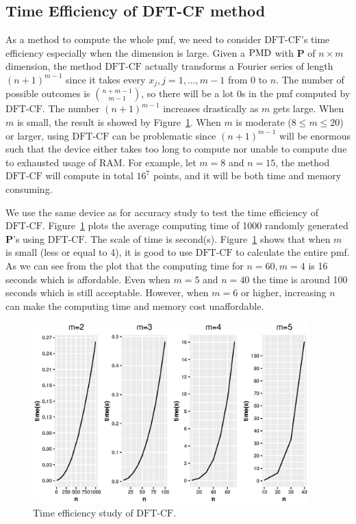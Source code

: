 \documentclass[12pt]{article}
\newcommand{\Pmat}{\mathbf{P}}
\newcommand{\PMD}{{\normalfont\textrm{PMD}}}
\newcommand{\dft}{{\textrm{DFT-CF}}}
\begin{document}
\subsection{Time Efficiency of DFT-CF method}
As a method to compute the whole pmf, we need to consider $\dft$'s time efficiency especially when the dimension is large. Given a $\PMD$ with $\Pmat$ of $n \times m$ dimension, the method $\dft$ actually transforms a Fourier series of length $(n+1)^{m-1}$ since it takes every $x_j,j=1,\dots,m-1$ from 0 to $n$. The number of possible outcomes is $\binom{n+m-1}{m-1}$, so there will be a lot 0s in the pmf computed by $\dft$. The number $(n+1)^{m-1}$ increases drastically as $m$ gets large. When $m$ is small, the result is showed by Figure~\ref{fig:time.eff}. When $m$ is moderate ($8 \leq m \leq 20$) or larger, using $\dft$ can be problematic since $(n+1)^{m-1}$ will be enormous such that the device either takes too long to compute nor unable to compute due to exhausted usage of RAM. For example, let $m=8$ and $n=15$, the method $\dft$ will compute in total $16^7$ points, and it will be both time and memory consuming.

We use the same device as for accuracy study to test the time efficiency of $\dft$. Figure~\ref{fig:time.eff} plots the average computing time of 1000 randomly generated $\Pmat$'s using $\dft$. The scale of time is second(s). Figure~\ref{fig:time.eff} shows that when $m$ is small (less or equal to 4), it is good to use $\dft$ to calculate the entire pmf. As we can see from the plot that the computing time for $n=60, m=4$ is 16 seconds which is affordable. Even when $m=5$ and $n=40$ the time is around 100 seconds which is still acceptable. However, when $m=6$ or higher, increasing $n$ can make the computing time and memory cost unaffordable.


\begin{figure}%
\begin{center}
	\includegraphics[width=0.95\textwidth]{figures/effi.eps}
	\caption{Time efficiency study of $\dft$.}
	\label{fig:time.eff}
\end{center}
\end{figure}
\end{document}

